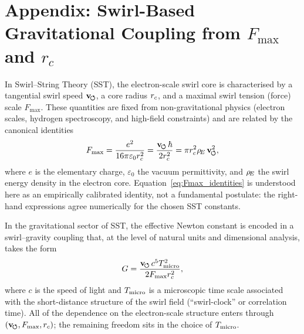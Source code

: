 \documentclass[11pt]{article}
\begin{document}


            \newcommand{\rhoF}{\rho_{\!f}}


    \section{Appendix: Swirl-Based Gravitational Coupling from \texorpdfstring{$F_{\max}$}{Fmax} and \texorpdfstring{$r_c$}{rc}}
        \label{sec:G_from_Fmax_rc}

        In Swirl--String Theory (SST), the electron-scale swirl core is
        characterised by a tangential swirl speed $\mathbf{v}_{\!\boldsymbol{\circlearrowleft}}$, a core radius
        $r_c$, and a maximal swirl tension (force) scale $F_{\max}$.  These
        quantities are fixed from non-gravitational physics (electron scales,
        hydrogen spectroscopy, and high-field constraints) and are related by
        the canonical identities
        \begin{equation}
            F_{\max}
            = \frac{e^2}{16\pi\varepsilon_0 r_c^2}
            = \frac{\mathbf{v}_{\!\boldsymbol{\circlearrowleft}}\,\hbar}{2 r_c^2}
            = \pi r_c^2 \rho_{\!E}\,\mathbf{v}_{\!\boldsymbol{\circlearrowleft}}^2,
            \label{eq:Fmax_identities}
        \end{equation}
        where $e$ is the elementary charge, $\varepsilon_0$ the vacuum
        permittivity, and $\rho_{\!E}$ the swirl energy density in the electron
        core.  Equation~\eqref{eq:Fmax_identities} is understood here as an
        empirically calibrated identity, not a fundamental postulate: the
        right-hand expressions agree numerically for the chosen SST constants.

        In the gravitational sector of SST, the effective Newton constant is
        encoded in a swirl--gravity coupling that, at the level of natural
        units and dimensional analysis, takes the form
        \begin{equation}
            G
            = \frac{\mathbf{v}_{\!\boldsymbol{\circlearrowleft}}\,c^5 T_{\rm micro}^2}
            {2 F_{\max} r_c^2},
            \label{eq:G_swirl_general}
        \end{equation}
        where $c$ is the speed of light and $T_{\rm micro}$ is a
        microscopic time scale associated with the short-distance structure
        of the swirl field (``swirl-clock'' or correlation time).  All of the
        dependence on the electron-scale structure enters through
        $(\mathbf{v}_{\!\boldsymbol{\circlearrowleft}},F_{\max},r_c)$; the remaining freedom sits in the choice of
        $T_{\rm micro}$.
\end{document}
